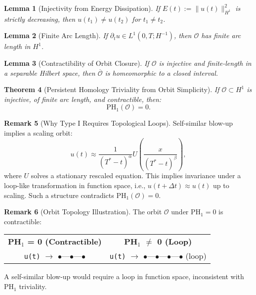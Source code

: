 \documentclass[11pt]{article}
\newtheorem{theorem}{Theorem}[section]
\newtheorem{lemma}[theorem]{Lemma}
\theoremstyle{definition}
\newtheorem{remark}[theorem]{Remark}
\begin{document}
\begin{lemma}[Injectivity from Energy Dissipation]
If $E(t) := \|u(t)\|^2_{H^1}$ is strictly decreasing, then $u(t_1) \neq u(t_2)$ for $t_1 \neq t_2$.
\end{lemma}

\begin{lemma}[Finite Arc Length]
If $\partial_t u \in L^1(0,T; H^{-1})$, then $\mathcal{O}$ has finite arc length in $H^1$.
\end{lemma}

\begin{lemma}[Contractibility of Orbit Closure]
If $\mathcal{O}$ is injective and finite-length in a separable Hilbert space, then $\overline{\mathcal{O}}$ is homeomorphic to a closed interval.
\end{lemma}

\begin{theorem}[Persistent Homology Triviality from Orbit Simplicity]
\label{thm:ph1-triviality}
If $\mathcal{O} \subset H^1$ is injective, of finite arc length, and contractible, then:
\[
\mathrm{PH}_1(\mathcal{O}) = 0.
\]
\end{theorem}

\begin{remark}[Why Type I Requires Topological Loops]
Self-similar blow-up implies a scaling orbit:
\[
u(t) \approx \frac{1}{(T^*-t)^{\alpha}} U\left( \frac{x}{(T^*-t)^{\beta}} \right),
\]
where $U$ solves a stationary rescaled equation. This implies invariance under a loop-like transformation in function space, i.e., $u(t+\Delta t) \approx u(t)$ up to scaling. Such a structure contradicts $\mathrm{PH}_1(\mathcal{O}) = 0$.
\end{remark}

\begin{remark}[Orbit Topology Illustration]
The orbit $\mathcal{O}$ under $\mathrm{PH}_1 = 0$ is contractible:

\begin{center}
\begin{tabular}{c c}
\textbf{PH$_1$ = 0 (Contractible)} & \textbf{PH$_1$ $\neq$ 0 (Loop)} \\
\texttt{u(t)} $\longrightarrow$ $\bullet$---$\bullet$---$\bullet$ & \texttt{u(t)} $\longrightarrow$ $\bullet$---$\bullet$---$\bullet$---$\bullet$ (loop)
\end{tabular}
\end{center}

A self-similar blow-up would require a loop in function space, inconsistent with PH$_1$ triviality.
\end{remark}
\end{document}
